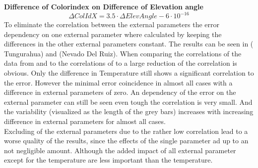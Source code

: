 \documentclass  [
  paper    = a4,
  BCOR     = 10mm,
  twoside,
  fontsize = 12pt,
  fleqn,
  toc      = bibnumbered,
  toc      = listofnumbered,
  numbers  = noendperiod,
  headings = normal,
  listof   = leveldown,
  version  = 3.03
]                                       {scrreprt}
\begin{document}
		\textbf{Difference of  Colorindex  on  Difference of Elevation angle}
		\begin{equation}
		\Delta ColIdX  =3.5\cdot \Delta ElevAngle-6\cdot 10^{-16}
		\end{equation}
	To eliminate the correlation between the external parameters the   error dependency on one external parameter where calculated by keeping the differences in the other external parameters constant. The results can be seen in  ( Tungurahua) and  (Nevado Del Ruiz). When comparing the correlations of the data from  and   to the correlations of 
	 to  a large reduction of the correlation is obvious. Only the difference in Temperature still shows a significant correlation to the   error. However the minimal   error coincidence in almost all cases with a difference in external parameters of zero. An dependency of the   error on the external parameter can still be seen even tough the correlation is very small. And the variability (visualized as the length of the grey bars) increases with increasing difference in external parameters for almost all cases.\\	
	Excluding of the external parameters due to the rather low correlation lead to a worse quality of the results, since the effects of the single parameter ad up to an 
	not negligible amount. Although the added impact of all external parameter except for the temperature are less important than the temperature.
\end{document}
